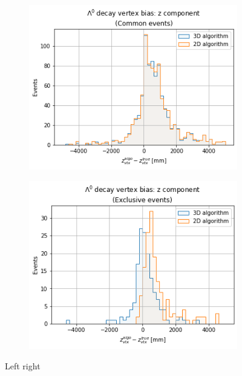 \begin{figure}[t]
	\centering
	\begin{subfigure}{.45\textwidth}
		\includegraphics[width=\textwidth]{graphics/03-vertex_reconstruction/3D_vs_2D_lambda_endvertex_bias_common.png}
		\caption{}
		\label{fig:3:3D_vs_2D_lambda_endvertex_bias_common}
	\end{subfigure}
	\begin{subfigure}{.45\textwidth}
		\includegraphics[width=\textwidth]{graphics/03-vertex_reconstruction/3D_vs_2D_lambda_endvertex_bias_exclusive.png}
		\caption{}
		\label{fig:3:3D_vs_2D_lambda_endvertex_bias_exclusive}
	\end{subfigure}
	\caption[A and b.]{Left right}
	\label{fig:3:3D_vs_2D_lambda_endvertex_bias_common_vs_exclusive}
\end{figure}

